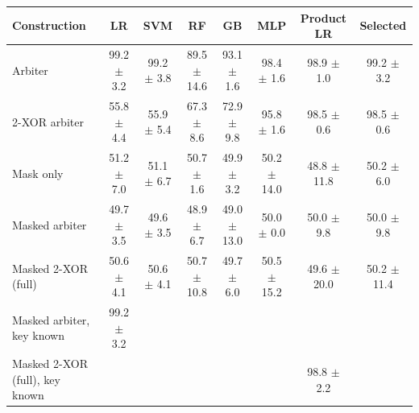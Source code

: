 \begin{tabular}{lccccccc}
\toprule
Construction & LR & SVM & RF & GB & MLP & Product LR & Selected \\
\midrule
Arbiter & 99.2 $\pm$ 3.2 & 99.2 $\pm$ 3.8 & 89.5 $\pm$ 14.6 & 93.1 $\pm$ 1.6 & 98.4 $\pm$ 1.6 & 98.9 $\pm$ 1.0 & 99.2 $\pm$ 3.2 \\
2-XOR arbiter & 55.8 $\pm$ 4.4 & 55.9 $\pm$ 5.4 & 67.3 $\pm$ 8.6 & 72.9 $\pm$ 9.8 & 95.8 $\pm$ 1.6 & 98.5 $\pm$ 0.6 & 98.5 $\pm$ 0.6 \\
Mask only & 51.2 $\pm$ 7.0 & 51.1 $\pm$ 6.7 & 50.7 $\pm$ 1.6 & 49.9 $\pm$ 3.2 & 50.2 $\pm$ 14.0 & 48.8 $\pm$ 11.8 & 50.2 $\pm$ 6.0 \\
Masked arbiter & 49.7 $\pm$ 3.5 & 49.6 $\pm$ 3.5 & 48.9 $\pm$ 6.7 & 49.0 $\pm$ 13.0 & 50.0 $\pm$ 0.0 & 50.0 $\pm$ 9.8 & 50.0 $\pm$ 9.8 \\
Masked 2-XOR (full) & 50.6 $\pm$ 4.1 & 50.6 $\pm$ 4.1 & 50.7 $\pm$ 10.8 & 49.7 $\pm$ 6.0 & 50.5 $\pm$ 15.2 & 49.6 $\pm$ 20.0 & 50.2 $\pm$ 11.4 \\
\midrule
Masked arbiter, key known & 99.2 $\pm$ 3.2 &  &  &  &  &  &  \\
Masked 2-XOR (full), key known &  &  &  &  &  & 98.8 $\pm$ 2.2 &  \\
\bottomrule
\end{tabular}
